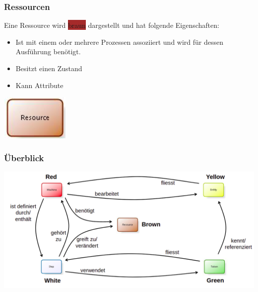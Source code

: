 \subsubsection{Ressourcen}
\begin{minipage}[t]{0.7\textwidth}
Eine Ressource wird \colorbox{brown}{braun} dargestellt und hat folgende Eigenschaften:
\begin{itemize}
    \item Ist mit einem oder mehrere Prozessen assoziiert und wird für dessen Ausführung benötigt. 
    \item Besitzt einen Zustand
    \item Kann Attribute
\end{itemize}
\end{minipage}
\begin{minipage}[t]{0.2\textwidth}
\includegraphics[width=0.6\linewidth]{images/simBPMN_ressource.png}


\end{minipage}

\subsubsection{Überblick}
\begin{minipage}[t]{0.9\textwidth}
\centering
\includegraphics[width=0.9\linewidth]{images/simBPMN_overview.png}
\end{minipage}
\newpage

